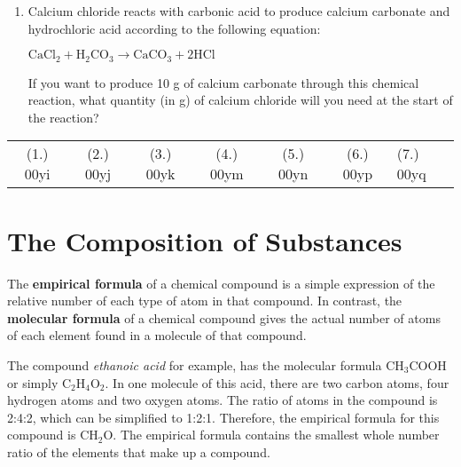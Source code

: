 {\begin{enumerate}
\item{Calcium chloride reacts with carbonic acid to produce calcium carbonate and hydrochloric acid according to the following equation:
\begin{center}
$\text{CaCl}_{2} + \text{H}_{2}\text{CO}_{3} \rightarrow \text{CaCO}_{3} + 2\text{HCl}$
\end{center}
If you want to produce 10 g of calcium carbonate through this chemical reaction, what quantity (in g) of calcium chloride will you need at the start of the reaction?}



\end{enumerate}
\practiceinfo

\begin{tabular}[h]{cccccc}
(1.) 00yi & (2.) 00yj & (3.) 00yk & (4.) 00ym & (5.) 00yn & (6.) 00yp & (7.) 00yq & 
 \end{tabular}
}







\section{The Composition of Substances}
\label{sec:quant:composition}

The \textbf{empirical formula} of a chemical compound is a simple expression of the relative number of each type of atom in that compound. In contrast, the \textbf{molecular formula} of a chemical compound gives the actual number of atoms of each element found in a molecule of that compound.



The compound \textit{ethanoic acid} for example, has the molecular formula CH$_{3}$COOH or simply C$_{2}$H$_{4}$O$_{2}$. In one molecule of this acid, there are two carbon atoms, four hydrogen atoms and two oxygen atoms. The ratio of atoms in the compound is 2:4:2, which can be simplified to 1:2:1. Therefore, the empirical formula for this compound is CH$_{2}$O. The empirical formula contains the smallest whole number ratio of the elements that make up a compound.\\

